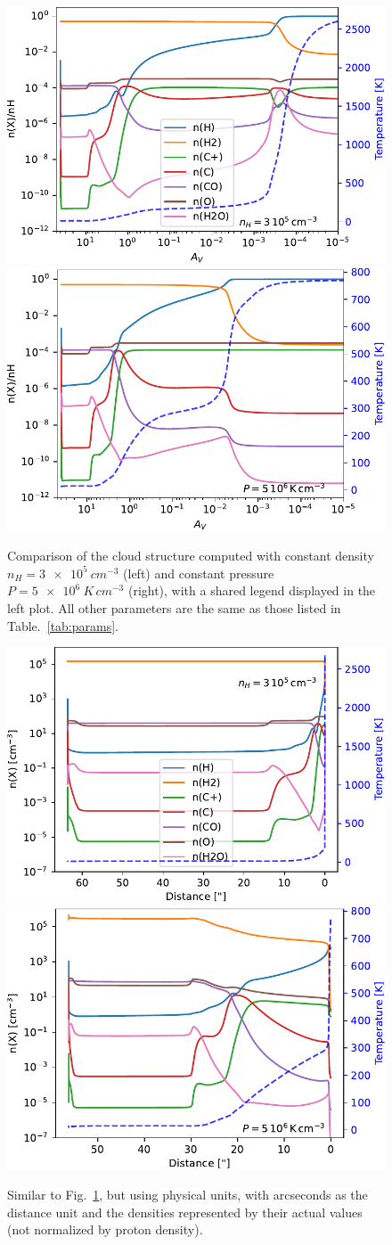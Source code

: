 \documentclass[12pt,a4paper]{article}
\begin{document}
\begin{figure}[ht]
    \centering
    \includegraphics[width=.49\textwidth,keepaspectratio]{struct_nH3e5.pdf}
    \includegraphics[width=.49\textwidth,keepaspectratio]{struct_P5e6.pdf}
    \caption{Comparison of the cloud structure computed with constant density $n_H = \qty{3e5}{cm^{-3}}$ (left) and constant pressure $P = \qty{5e6}{K\,cm^{-3}}$ (right), with a shared legend displayed in the left plot. All other parameters are the same as those listed in Table.~\ref{tab:params}.} \label{fig:cmp_cstp_cstn}
\end{figure}

\begin{figure}[ht]
    \centering
    \includegraphics[width=.49\textwidth,keepaspectratio]{struct_nH3e5_arcsec.pdf}
    \includegraphics[width=.49\textwidth,keepaspectratio]{struct_P5e6_arcsec.pdf}
    \caption{Similar to Fig.~\ref{fig:cmp_cstp_cstn}, but using physical units, with arcseconds as the distance unit and the densities represented by their actual values (not normalized by proton density).} \label{fig:cmp_cstp_cstn_arcsec}
\end{figure}
\end{document}
